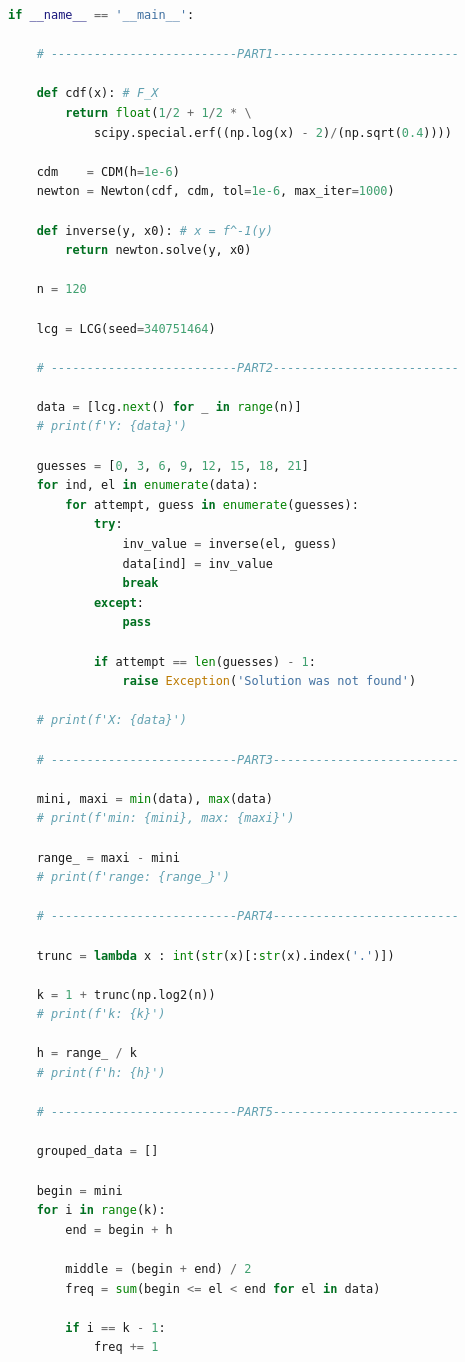 \documentclass[a4paper, 14pt]{extarticle}
\begin{document}
\begin{center}
\begin{lstlisting}[language=Python]
if __name__ == '__main__':

    # --------------------------PART1--------------------------

    def cdf(x): # F_X
        return float(1/2 + 1/2 * \
            scipy.special.erf((np.log(x) - 2)/(np.sqrt(0.4))))

    cdm    = CDM(h=1e-6)
    newton = Newton(cdf, cdm, tol=1e-6, max_iter=1000)

    def inverse(y, x0): # x = f^-1(y)
        return newton.solve(y, x0)

    n = 120

    lcg = LCG(seed=340751464)

    # --------------------------PART2--------------------------

    data = [lcg.next() for _ in range(n)]
    # print(f'Y: {data}')

    guesses = [0, 3, 6, 9, 12, 15, 18, 21]
    for ind, el in enumerate(data):
        for attempt, guess in enumerate(guesses):
            try: 
                inv_value = inverse(el, guess)
                data[ind] = inv_value
                break
            except:
                pass

            if attempt == len(guesses) - 1:
                raise Exception('Solution was not found')
    
    # print(f'X: {data}')

    # --------------------------PART3--------------------------

    mini, maxi = min(data), max(data)
    # print(f'min: {mini}, max: {maxi}')

    range_ = maxi - mini
    # print(f'range: {range_}')

    # --------------------------PART4--------------------------

    trunc = lambda x : int(str(x)[:str(x).index('.')])

    k = 1 + trunc(np.log2(n))
    # print(f'k: {k}')
    
    h = range_ / k
    # print(f'h: {h}')

    # --------------------------PART5--------------------------

    grouped_data = []

    begin = mini
    for i in range(k):
        end = begin + h

        middle = (begin + end) / 2
        freq = sum(begin <= el < end for el in data)
        
        if i == k - 1:
            freq += 1


\end{lstlisting}
\end{center}
\end{document}
